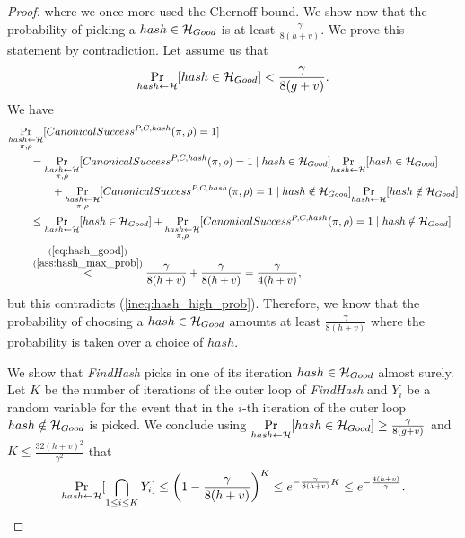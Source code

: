 \begin{proof}
where we once more used the Chernoff bound.
We show now that the probability of picking a $hash \in \mathcal{H}_{Good}$ is at least $\frac{\gamma}{8(h+v)}$.
We prove this statement by contradiction. Let assume us that
\begin{align}
  \label{ass:hash_max_prob}
\underset{hash \leftarrow \mathcal{H}}{\Pr}[hash \in \mathcal{H}_{Good}] < \frac{\gamma}{8(g+v)}.
\end{align}
We have
\begin{align*}
  &\underset{\substack{hash \leftarrow \mathcal{H} \\ \pi, \rho}}{\Pr}[CanonicalSuccess^{P,C,hash}(\pi, \rho) = 1] \\
  &\mbox\qquad = \underset{\substack{ hash \leftarrow \mathcal{H} \\ \pi, \rho}}{\Pr}[CanonicalSuccess^{P,C,hash}(\pi, \rho) = 1 \mid hash \in \mathcal{H}_{Good}]
  \underset{hash \leftarrow \mathcal{H}}{\Pr}[hash \in \mathcal{H}_{Good}] \\
  & \mbox\qquad\qquad + \underset{\substack{hash \leftarrow \mathcal{H} \\ \pi, \rho}}{\Pr}[CanonicalSuccess^{P,C,hash}(\pi, \rho) = 1 \mid hash \notin \mathcal{H}_{Good}]
  \underset{hash \leftarrow \mathcal{H}}{\Pr}[hash \notin \mathcal{H}_{Good}] \\
  & \mbox\qquad \leq \underset{hash \leftarrow \mathcal{H}}{\Pr}[hash \in \mathcal{H}_{Good}] +
  \underset{\substack{hash \leftarrow \mathcal{H} \\ \pi, \rho}}{\Pr}[CanonicalSuccess^{P,C,hash}(\pi, \rho) = 1 \mid hash \notin \mathcal{H}_{Good}] \\
  & \mbox\qquad  \stackrel{\substack{ (\ref{eq:hash_good}) \\ (\ref{ass:hash_max_prob})}}{<} \frac{\gamma}{8(h+v)} + \frac{\gamma}{8(h+v)} = \frac{\gamma}{4(h+v)},
\end{align*}
but this contradicts (\ref{ineq:hash_high_prob}).
Therefore, we know that the probability of choosing a $hash \in \mathcal{H}_{Good}$ amounts at least $\frac{\gamma}{8(h+v)}$
where the probability is taken over a choice of $hash$.

We show that \textit{FindHash} picks in one of its iteration $hash \in \mathcal{H}_{Good}$ almost surely.
Let $K$ be the number of iterations of the outer loop of \textit{FindHash} and $Y_i$ be a random variable for the event
that in the $i$-th iteration of the outer loop $hash \notin \mathcal{H}_{Good}$ is picked.
We conclude using $\underset{hash \leftarrow \mathcal{H}}{\Pr}[hash \in \mathcal{H}_{Good}] \geq \frac{\gamma}{8(g+v)}$ and $K \leq \frac{32(h+v)^2}{\gamma^2}$ that
\begin{align*}
  \underset{hash \leftarrow \mathcal{H}}{\Pr}[ \bigcap_{1 \leq i \leq K} Y_i ] \leq \left(1 - \frac{\gamma}{8(h+v)}\right)^{K}
    \leq e^{-\frac{\gamma}{8(h+v)} K}
    \leq e^{-\frac{4(h+v)}{\gamma}}.
\end{align*}
\end{proof}
